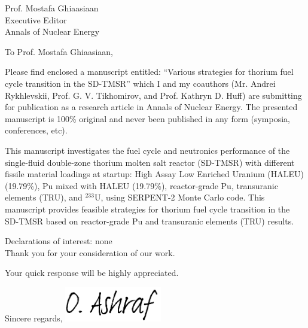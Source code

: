 \documentclass[11pt]{letter} %
\newcommand{\RecipientName}{Prof. Mostafa Ghiaasiaan\xspace}
\newcommand{\RecipientAddress}{Executive Editor\\Annals of Nuclear Energy}
\begin{document}
	\begin{letter}{\RecipientName\\
			\RecipientAddress\xspace}
		
		\address{O. Ashraf\\
			oabdelaziz@mephi.ru\\
			osama.ashraf@edu.asu.edu.eg\\
			Institute of Nuc. Physics and Eng.\\
			National Research Nuclear University\\
			Moscow, Russia, 115409}
		
		
		\opening{To \RecipientName,}
		
		Please find enclosed a manuscript entitled: ``Various strategies for thorium fuel cycle transition in the SD-TMSR'' which I and my coauthors (Mr. Andrei Rykhlevskii, Prof. G. V. Tikhomirov, 
		and Prof. Kathryn D. Huff) are submitting for publication as a research article 
		in Annals of Nuclear Energy. The presented manuscript is 100\% original and never been published in any form (symposia, conferences, etc). 
		
		This manuscript investigates the fuel cycle and neutronics performance of the single-fluid double-zone thorium molten salt reactor (SD-TMSR) with different fissile material loadings at startup: High Assay Low Enriched Uranium (HALEU) (19.79\%), Pu mixed with HALEU (19.79\%), reactor-grade Pu, transuranic elements (TRU), and $^{233}$U, using SERPENT-2 Monte Carlo code. This manuscript provides feasible strategies for thorium fuel cycle transition in the SD-TMSR based on reactor-grade Pu and transuranic elements (TRU) results.
		
		Declarations of interest: none\\
		
		Thank you for your consideration of our work.
		
		Your quick response will be highly appreciated.
		
		\closing{Sincere regards,
			\includegraphics[height=1.5cm]{signature.png}\\
		}
		
		
	\end{letter}
	
\end{document}

